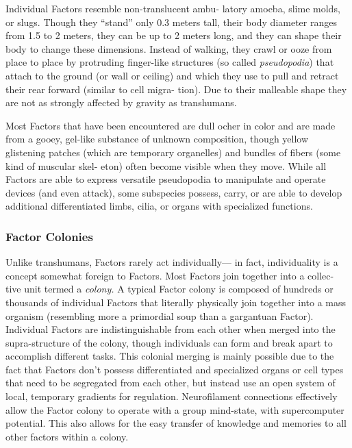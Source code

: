 Individual Factors resemble non-translucent ambu-
latory amoeba, slime molds, or slugs. Though they 
``stand'' only 0.3 meters tall, their body diameter 
ranges from 1.5 to 2 meters, they can be up to 2 
meters long, and they can shape their body to change 
these dimensions. Instead of walking, they crawl or 
ooze from place to place by protruding finger-like 
structures (so called \textit{pseudopodia}) that attach to the 
ground (or wall or ceiling) and which they use to pull 
and retract their rear forward (similar to cell migra-
tion). Due to their malleable shape they are not as 
strongly affected by gravity as transhumans.

Most Factors that have been encountered are dull 
ocher in color and are made from a gooey, gel-like 
substance of unknown composition, though yellow 
glistening patches (which are temporary organelles) 
and bundles of fibers (some kind of muscular skel-
eton) often become visible when they move. While 
all Factors are able to express versatile pseudopodia 
to manipulate and operate devices (and even attack), 
some subspecies possess, carry, or are able to develop 
additional differentiated limbs, cilia, or organs with 
specialized functions.

\subsubsection{Factor Colonies}

Unlike transhumans, Factors rarely act individually—
in fact, individuality is a concept somewhat foreign 
to Factors. Most Factors join together into a collec-
tive unit termed a \textit{colony.} A typical Factor colony is 
composed of hundreds or thousands of individual 
Factors that literally physically join together into a 
mass organism (resembling more a primordial soup 
than a gargantuan Factor). Individual Factors are 
indistinguishable from each other when merged into 
the supra-structure of the colony, though individuals 
can form and break apart to accomplish different 
tasks. This colonial merging is mainly possible due 
to the fact that Factors don't possess differentiated 
and specialized organs or cell types that need to be 
segregated from each other, but instead use an open 
system of local, temporary gradients for regulation. 
Neurofilament connections effectively allow the 
Factor colony to operate with a group mind-state, 
with supercomputer potential. This also allows for the 
easy transfer of knowledge and memories to all other 
factors within a colony.

